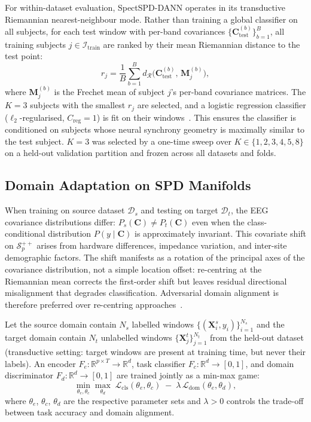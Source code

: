 For within-dataset evaluation, SpectSPD-DANN operates in its transductive
Riemannian nearest-neighbour mode.
Rather than training a global classifier on all subjects, for each test window
with per-band covariances $\{\mathbf{C}^{(b)}_\mathrm{test}\}_{b=1}^B$, all
training subjects $j\in\mathcal{I}_\mathrm{train}$ are ranked by their mean
Riemannian distance to the test point:
\begin{equation}
  r_j = \frac{1}{B}\sum_{b=1}^{B}
    d_\mathcal{R}\!\bigl(\mathbf{C}^{(b)}_\mathrm{test},\,
    \mathbf{M}^{(b)}_j\bigr),
  \label{eq:nrde_dist}
\end{equation}
where $\mathbf{M}^{(b)}_j$ is the Frechet mean of subject $j$'s per-band
covariance matrices.
The $K=3$ subjects with the smallest $r_j$ are selected, and a logistic
regression classifier ($\ell_2$-regularised, $C_{\mathrm{reg}}=1$) is fit on
their windows~\cite{barachant2010riemannian}.
This ensures the classifier is conditioned on subjects whose neural synchrony
geometry is maximally similar to the test subject.
$K=3$ was selected by a one-time sweep over $K\in\{1,2,3,4,5,8\}$ on a
held-out validation partition and frozen across all datasets and folds.

\subsection{Domain Adaptation on SPD Manifolds}
\label{sec:da}

When training on source dataset $\mathcal{D}_s$ and testing on target
$\mathcal{D}_t$, the EEG covariance distributions differ:
$P_s(\mathbf{C})\neq P_t(\mathbf{C})$ even when the class-conditional
distribution $P(y\mid\mathbf{C})$ is approximately invariant.
This covariate shift on $\mathcal{S}^{++}_p$ arises from hardware
differences, impedance variation, and inter-site demographic factors.
The shift manifests as a rotation of the principal axes of the covariance
distribution, not a simple location offset: re-centring at the Riemannian
mean corrects the first-order shift but leaves residual directional
misalignment that degrades classification.
Adversarial domain alignment is therefore preferred over re-centring
approaches~\cite{ganin2017dann}.

Let the source domain contain $N_s$ labelled windows
$\{(\mathbf{X}_i^s, y_i)\}_{i=1}^{N_s}$ and the target domain contain
$N_t$ unlabelled windows $\{\mathbf{X}_j^t\}_{j=1}^{N_t}$ from the held-out
dataset (transductive setting: target windows are present at training time, but
never their labels).
An encoder $F_e:\mathbb{R}^{p\times T}\to\mathbb{R}^d$, task classifier
$F_c:\mathbb{R}^d\to[0,1]$, and domain discriminator
$F_d:\mathbb{R}^d\to[0,1]$ are trained jointly as a min-max game:
\begin{equation}
  \min_{\theta_e,\theta_c}\max_{\theta_d}
    \;\mathcal{L}_\mathrm{cls}(\theta_e,\theta_c)
    \;-\;\lambda\,\mathcal{L}_\mathrm{dom}(\theta_e,\theta_d),
  \label{eq:minmax}
\end{equation}
where $\theta_e$, $\theta_c$, $\theta_d$ are the respective parameter sets
and $\lambda>0$ controls the trade-off between task accuracy and domain alignment.

